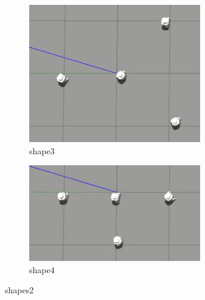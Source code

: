 \documentclass[12pt]{extarticle}
\begin{document}
\begin{figure}
\centering
\begin{subfigure}{.5\textwidth}
  \centering
  \includegraphics[width=.9\linewidth]{shape3}
  \caption{shape3}
  \label{fig:sub1}
\end{subfigure}%
\begin{subfigure}{.5\textwidth}
  \centering
  \includegraphics[width=.9\linewidth]{shape4}
  \caption{shape4}
  \label{fig:sub2}
\end{subfigure}
\caption{shapes2}
\label{fig:test}



\end{figure}
\end{document}

